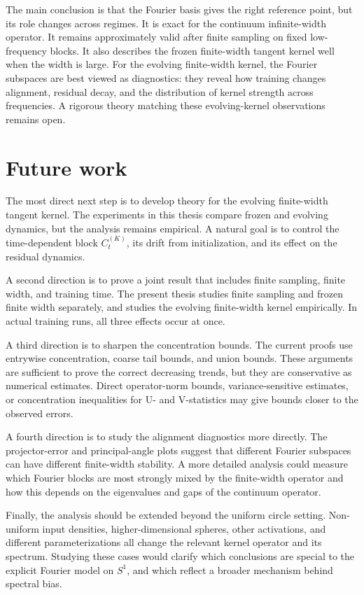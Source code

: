 The main conclusion is that the Fourier basis gives the right reference point,
but its role changes across regimes. It is exact for the continuum
infinite-width operator. It remains approximately valid after finite sampling
on fixed low-frequency blocks. It also describes the frozen finite-width
tangent kernel well when the width is large. For the evolving finite-width
kernel, the Fourier subspaces are best viewed as diagnostics: they reveal how
training changes alignment, residual decay, and the distribution of kernel
strength across frequencies. A rigorous theory matching these evolving-kernel
observations remains open.

\section{Future work}
\label{sec:future-work}

The most direct next step is to develop theory for the evolving finite-width
tangent kernel. The experiments in this thesis compare frozen and evolving
dynamics, but the analysis remains empirical. A natural goal is to control the
time-dependent block \(C_t^{(K)}\), its drift from initialization, and its effect
on the residual dynamics.

A second direction is to prove a joint result that includes finite sampling,
finite width, and training time. The present thesis studies finite sampling and
frozen finite width separately, and studies the evolving finite-width kernel
empirically. In actual training runs, all three effects occur at once.

A third direction is to sharpen the concentration bounds. The current proofs use
entrywise concentration, coarse tail bounds, and union bounds. These arguments
are sufficient to prove the correct decreasing trends, but they are conservative
as numerical estimates. Direct operator-norm bounds, variance-sensitive
estimates, or concentration inequalities for U- and V-statistics may give bounds
closer to the observed errors.

A fourth direction is to study the alignment diagnostics more directly. The
projector-error and principal-angle plots suggest that different Fourier
subspaces can have different finite-width stability. A more detailed analysis
could measure which Fourier blocks are most strongly mixed by the finite-width
operator and how this depends on the eigenvalues and gaps of the continuum
operator.

Finally, the analysis should be extended beyond the uniform circle setting.
Non-uniform input densities, higher-dimensional spheres, other activations, and
different parameterizations all change the relevant kernel operator and its
spectrum. Studying these cases would clarify which conclusions are special to
the explicit Fourier model on \(S^1\), and which reflect a broader mechanism
behind spectral bias.
